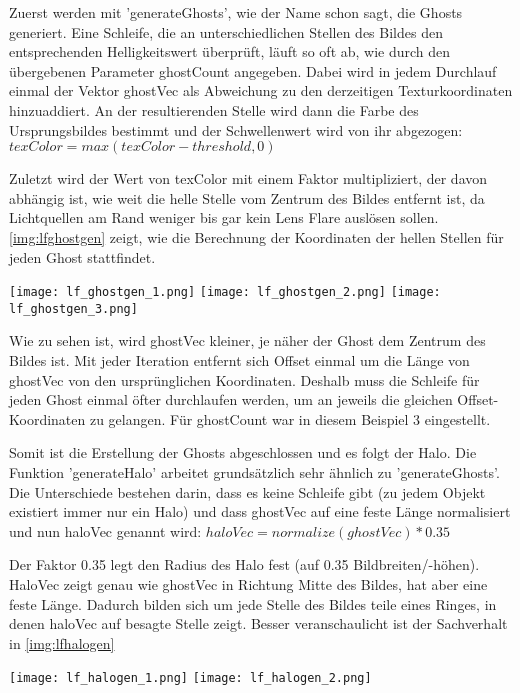 Zuerst werden mit 'generateGhosts', wie der Name schon sagt, die Ghosts generiert. Eine Schleife, die an unterschiedlichen Stellen des Bildes den entsprechenden Helligkeitswert überprüft, läuft so oft ab, wie durch den übergebenen Parameter ghostCount angegeben. Dabei wird in jedem Durchlauf einmal der Vektor ghostVec als Abweichung zu den derzeitigen Texturkoordinaten hinzuaddiert. An der resultierenden Stelle wird dann die Farbe des Ursprungsbildes bestimmt und der Schwellenwert wird von ihr abgezogen: $texColor = max(texColor - threshold, 0)$

Zuletzt wird der Wert von texColor mit einem Faktor multipliziert, der davon abhängig ist, wie weit die helle Stelle vom Zentrum des Bildes entfernt ist, da Lichtquellen am Rand weniger bis gar kein Lens Flare auslösen sollen. \autoref{img:lfghostgen} zeigt, wie die Berechnung der Koordinaten der hellen Stellen für jeden Ghost stattfindet.

\captionsetup{type=figure}
\texttt{[image: lf\_ghostgen\_1.png]}
\texttt{[image: lf\_ghostgen\_2.png]}
\texttt{[image: lf\_ghostgen\_3.png]}
\label{img:lfghostgen}

Wie zu sehen ist, wird ghostVec kleiner, je näher der Ghost dem Zentrum des Bildes ist. Mit jeder Iteration entfernt sich Offset einmal um die Länge von ghostVec von den ursprünglichen Koordinaten. Deshalb muss die Schleife für jeden Ghost einmal öfter durchlaufen werden, um an jeweils die gleichen Offset-Koordinaten zu gelangen. Für ghostCount war in diesem Beispiel 3 eingestellt.

Somit ist die Erstellung der Ghosts abgeschlossen und es folgt der Halo. Die Funktion 'generateHalo' arbeitet grundsätzlich sehr ähnlich zu 'generateGhosts'. Die Unterschiede bestehen darin, dass es keine Schleife gibt (zu jedem Objekt existiert immer nur ein Halo) und dass ghostVec auf eine feste Länge normalisiert und nun haloVec genannt wird: $haloVec = normalize(ghostVec) * 0.35$

Der Faktor 0.35 legt den Radius des Halo fest (auf 0.35 Bildbreiten/-höhen). HaloVec zeigt genau wie ghostVec in Richtung Mitte des Bildes, hat aber eine feste Länge. Dadurch bilden sich um jede Stelle des Bildes teile eines Ringes, in denen haloVec auf besagte Stelle zeigt. Besser veranschaulicht ist der Sachverhalt in \autoref{img:lfhalogen}

\captionsetup{type=figure}
\texttt{[image: lf\_halogen\_1.png]}
\texttt{[image: lf\_halogen\_2.png]}
\label{img:lfhalogen}

